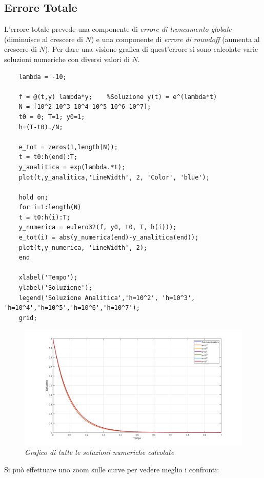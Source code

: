 \subsection{Errore Totale}
L'errore totale prevede una componente di \textit{errore di troncamento globale} (diminuisce al crescere di $N$) e una componente di \textit{errore di roundoff} (aumenta al crescere di $N$). Per dare una visione grafica di quest'errore si sono calcolate varie soluzioni numeriche con diversi valori di $N$.
\begin{verbatim}
	lambda = -10;
	
	f = @(t,y) lambda*y;    %Soluzione y(t) = e^(lambda*t)
	N = [10^2 10^3 10^4 10^5 10^6 10^7];          
	t0 = 0; T=1; y0=1; 
	h=(T-t0)./N;            
	
	e_tot = zeros(1,length(N));
	t = t0:h(end):T;
	y_analitica = exp(lambda.*t);
	plot(t,y_analitica,'LineWidth', 2, 'Color', 'blue');
	
	hold on;
	for i=1:length(N)
	t = t0:h(i):T; 
	y_numerica = eulero32(f, y0, t0, T, h(i)));
	e_tot(i) = abs(y_numerica(end)-y_analitica(end));
	plot(t,y_numerica, 'LineWidth', 2);
	end
	
	xlabel('Tempo');
	ylabel('Soluzione');
	legend('Soluzione Analitica','h=10^2', 'h=10^3', 'h=10^4','h=10^5','h=10^6','h=10^7');
	grid;
\end{verbatim}
\begin{figure}[H]
	\centering   
	\includegraphics[width=\textwidth]{matlab/esercizio1_soluzioni.png}
	\caption{\textit{Grafico di tutte le soluzioni numeriche calcolate}}
\end{figure}
Si può effettuare uno zoom sulle curve per vedere meglio i confronti:
